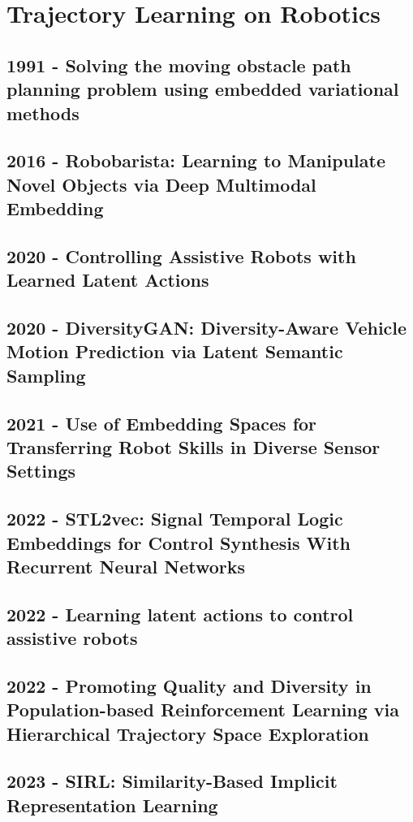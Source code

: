 \section{Trajectory Learning on Robotics}\label{sec: traj learning robotics}

\subsection*{1991 - Solving the moving obstacle path planning problem using embedded variational methods}
\cite{tominaga1991solving}

\subsection*{2016 - Robobarista: Learning to Manipulate Novel Objects via Deep Multimodal Embedding}
\cite{sung2016robobarista}

\subsection*{2020 - Controlling Assistive Robots with Learned Latent Actions}
\cite{losey2020controlling}

\subsection*{2020 - DiversityGAN: Diversity-Aware Vehicle Motion Prediction via Latent Semantic Sampling}
\cite{huang2020diversitygan}

\subsection*{2021 - Use of Embedding Spaces for Transferring Robot Skills in Diverse Sensor Settings}
\cite{ninomiya2021use}

\subsection*{2022 - STL2vec: Signal Temporal Logic Embeddings for Control Synthesis With Recurrent Neural Networks}
\cite{hashimoto2022stl2vec}

\subsection*{2022 - Learning latent actions to control assistive robots}
\cite{losey2022learning}

\subsection*{2022 - Promoting Quality and Diversity in Population-based Reinforcement Learning via Hierarchical Trajectory Space Exploration}
\cite{miao2022promoting}

\subsection*{2023 - SIRL: Similarity-Based Implicit Representation Learning}
\cite{bobu2023sirl}

